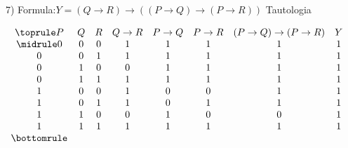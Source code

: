 7)
Formula:$Y = (Q \rightarrow R) \rightarrow ((P \rightarrow Q) \rightarrow (P \rightarrow R))$ Tautologia

$\begin{array}{cccccccc}
\toprule
P & Q & R & Q \rightarrow R & P \rightarrow Q & P \rightarrow R & (P \rightarrow Q) \rightarrow (P \rightarrow R) & Y \\
\midrule
0 & 0 & 0 & 1 & 1 & 1 & 1 & 1 \\
0 & 0 & 1 & 1 & 1 & 1 & 1 & 1 \\
0 & 1 & 0 & 0 & 1 & 1 & 1 & 1 \\
0 & 1 & 1 & 1 & 1 & 1 & 1 & 1 \\
1 & 0 & 0 & 1 & 0 & 0 & 1 & 1 \\
1 & 0 & 1 & 1 & 0 & 1 & 1 & 1 \\
1 & 1 & 0 & 0 & 1 & 0 & 0 & 1 \\
1 & 1 & 1 & 1 & 1 & 1 & 1 & 1 \\
\bottomrule
\end{array}$
